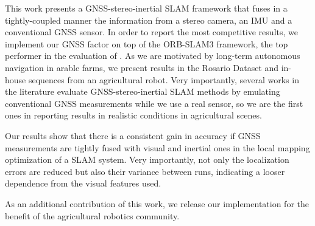 This work presents a GNSS-stereo-inertial SLAM framework that fuses in a tightly-coupled manner the information from a stereo camera, an IMU and a conventional GNSS sensor. In order to report the most competitive results, we implement our GNSS factor on top of the ORB-SLAM3 framework, the top performer in the evaluation of \cite{cremona2022evaluation}. As we are motivated by long-term autonomous navigation in arable farms, we present results in the Rosario Dataset and in-house sequences from an agricultural robot. Very importantly, several works in the literature evaluate GNSS-stereo-inertial SLAM methods by emulating conventional GNSS measurements while we use a real sensor, so we are the first ones in reporting results in realistic conditions in agricultural scenes.

Our results show that there is a consistent gain in accuracy if GNSS measurements are tightly fused with visual and inertial ones in the local mapping optimization of a SLAM system. Very importantly, not only the localization errors are reduced but also their variance between runs, indicating a looser dependence from the visual features used.

As an additional contribution of this work, we release our implementation for the benefit of the agricultural robotics community.


